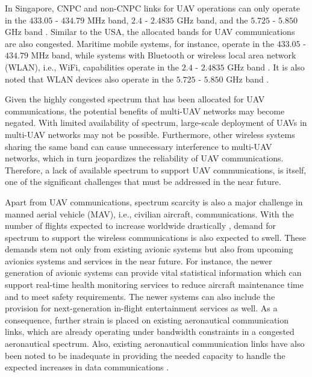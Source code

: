 In Singapore, CNPC and non-CNPC links for UAV operations can only operate in the $433.05$ - $434.79$ MHz band, $2.4$ - $2.4835$ GHz band, and the $5.725$ - $5.850$ GHz band \cite{imda_operation2019}. Similar to the USA, the allocated bands for UAV communications are also congested. Maritime mobile systems, for instance, operate in the $433.05$ - $434.79$ MHz band, while systems with Bluetooth or wireless local area network (WLAN), i.e., WiFi, capabilities operate in the $2.4$ - $2.4835$ GHz band \cite{imda2019chart_spectrum, imda_spectrum2019}. It is also noted that WLAN devices also operate in the $5.725$ - $5.850$ GHz band \cite{imda2019chart_spectrum, imda_spectrum2019}. 

Given the highly congested spectrum that has been allocated for UAV communications, the potential benefits of multi-UAV networks may become negated. With limited availability of spectrum, large-scale deployment of UAVs in multi-UAV networks may not be possible. Furthermore, other wireless systems sharing the same band can cause unnecessary interference to multi-UAV networks, which in turn jeopardizes the reliability of UAV communications. Therefore, a lack of available spectrum to support UAV communications, is itself, one of the significant challenges that must be addressed in the near future.

Apart from UAV communications, spectrum scarcity is also a major challenge in manned aerial vehicle (MAV), i.e., civilian aircraft, communications. With the number of flights expected to increase worldwide drastically \cite{eurocontrol2013}, demand for spectrum to support the wireless communications is also expected to swell. These demands stem not only from existing avionic systems but also from upcoming avionics systems and services in the near future. For instance, the newer generation of avionic systems can provide vital statistical information which can support real-time health monitoring services to reduce aircraft maintenance time and to meet safety requirements. The newer systems can also include the provision for next-generation in-flight entertainment services as well. As a consequence, further strain is placed on existing aeronautical communication links, which are already operating under bandwidth constraints in a congested aeronautical spectrum. Also, existing aeronautical communication links have also been noted to be inadequate in providing the needed capacity to handle the expected increases in data communications \cite{neji2013survey}.

